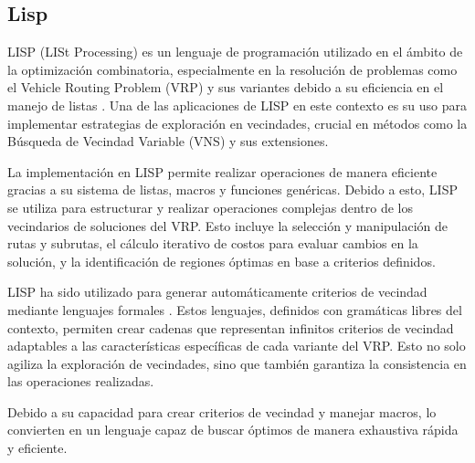 \documentclass{article}
\begin{document}
\subsection{Lisp}
 LISP (LISt Processing) es un lenguaje de programación utilizado en el ámbito de la optimización combinatoria, especialmente en la resolución de problemas como el Vehicle Routing Problem (VRP) y sus variantes debido a su eficiencia en el manejo de listas \cite{ref1,ref2,ref3,ref4,ref16}. Una de las aplicaciones de LISP en este contexto es su uso para implementar estrategias de exploración en vecindades, crucial en métodos como la Búsqueda de Vecindad Variable (VNS) y sus extensiones.

La implementación en LISP permite realizar operaciones de manera eficiente gracias a su sistema de listas, macros y funciones genéricas. Debido a esto, LISP se utiliza para estructurar y realizar operaciones complejas dentro de los vecindarios de soluciones del VRP. Esto incluye la selección y manipulación de rutas y subrutas, el cálculo iterativo de costos para evaluar cambios en la solución, y la identificación de regiones óptimas en base a criterios definidos. 

LISP ha sido utilizado para generar automáticamente criterios de vecindad mediante lenguajes formales \cite{ref16}. Estos lenguajes, definidos con gramáticas libres del contexto, permiten crear cadenas que representan infinitos criterios de vecindad adaptables a las características específicas de cada variante del VRP. Esto no solo agiliza la exploración de vecindades, sino que también garantiza la consistencia en las operaciones realizadas. 

Debido a su capacidad para crear criterios de vecindad y manejar macros, lo convierten en un lenguaje capaz de buscar óptimos de manera exhaustiva rápida y eficiente.


 
\end{document}
